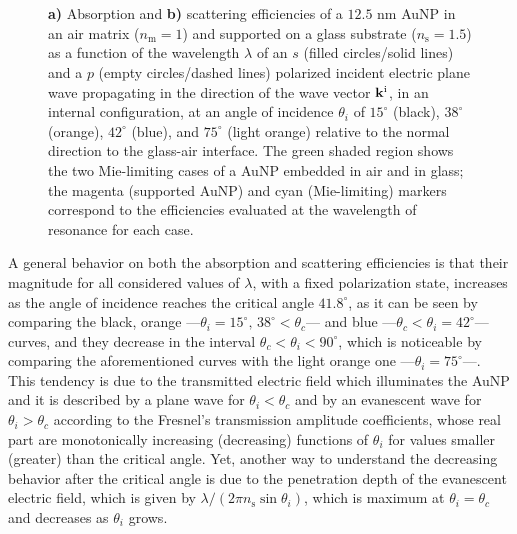 \begin{figure}[h!]
    \def\svgwidth{.95\textwidth}
    \centering
    \\[-19.5em]%
    \hspace*{-28.5em}%
        \begin{subfigure}{.71\textwidth}\caption{ }\label{sfig:SuppObl:Eff:Abs}\end{subfigure}%
        \begin{subfigure}{.25\textwidth}\caption{ }\label{sfig:SuppObl:Eff:Sca}\end{subfigure}\\[17.5em]
    \caption[Absorption and Scattering Efficiencies of a 12.5 nm AuNP on a Interface Illuminated in an internal configuration at oblique incidence]{\textbf{a)} Absorption and \textbf{b)} scattering efficiencies of a $12.5$ nm AuNP in an air matrix ($n_\text{m} = 1$) and supported on a glass substrate ($n_\text{s} = 1.5$) as a function of the wavelength $\lambda$ of an  $s$ (filled circles/solid lines) and a $p$ (empty circles/dashed lines) polarized incident electric plane wave propagating in the direction of the wave vector $\vb{k}^\text{i}$, in an internal configuration, at an angle of incidence $\theta_i$ of $15^\circ$ (black),  $38^\circ$ (orange),  $42^\circ$ (blue), and  $75^\circ$ (light orange) relative to the normal direction to the glass-air interface. The green shaded region shows the two Mie-limiting cases of a AuNP embedded in air and in glass; the magenta (supported AuNP) and cyan (Mie-limiting) markers correspond to the efficiencies evaluated at the wavelength of resonance for each case.}
\label{fig:SuppObl:Eff}
\end{figure}

A general behavior on both the absorption and scattering efficiencies is that their magnitude for all considered values of $\lambda$, with a fixed polarization state, increases as the angle of incidence reaches the critical angle $41.8^\circ$, as it can be seen by comparing the black, orange ---$\theta_i = 15^\circ,\, 38^\circ < \theta_c$---  and blue ---$\theta_c<\theta_i = 42^\circ$--- curves, and they decrease in the interval  $\theta_c<\theta_i<90^\circ$, which is noticeable by comparing the aforementioned curves with the light orange one ---$\theta_i = 75^\circ$---. This tendency is due to the transmitted electric field which illuminates the AuNP and it is described by a plane wave for $\theta_i<\theta_c$ and by an evanescent wave for $\theta_i>\theta_c$ according to the Fresnel's transmission amplitude coefficients, whose real part are monotonically increasing (decreasing) functions of $\theta_i$ for values smaller (greater) than the critical angle. Yet, another way to understand the decreasing behavior after the critical angle is due to the penetration depth of the evanescent electric field, which is given by $\lambda/(2\pi n_\text{s}\sin\theta_i)$, which is maximum at $\theta_i =\theta_c$ and decreases as $\theta_i$ grows.

